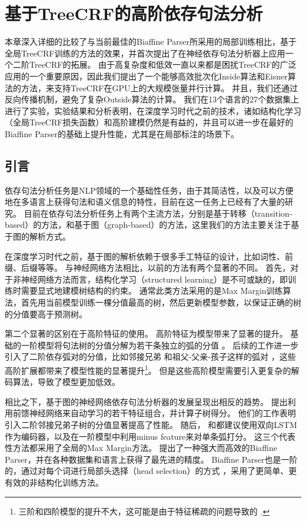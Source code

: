 \chapter{基于TreeCRF的高阶依存句法分析}\label{cha:dep-crf}

本章深入详细的比较了与当前最佳的Biaffine Parser所采用的局部训练相比，基于全局TreeCRF训练的方法的效果，并首次提出了在神经依存句法分析器上应用一个二阶TreeCRF的拓展。
由于高复杂度和低效一直以来都是困扰TreeCRF的广泛应用的一个重要原因，因此我们提出了一个能够高效批次化Inside算法和Eisner算法的方法，来支持TreeCRF在GPU上的大规模张量并行计算。
并且，我们还通过反向传播机制，避免了复杂Outside算法的计算。
我们在13个语言的27个数据集上进行了实验，实验结果和分析表明，在深度学习时代之前的技术，诸如结构化学习（全局TreeCRF损失函数）和高阶建模仍然是有益的，并且可以进一步在最好的Biaffine Parser的基础上提升性能，尤其是在局部标注的场景下。

\section{引言}
依存句法分析任务是NLP领域的一个基础性任务，由于其简洁性，以及可以方便地在多语言上获得句法和语义信息的特性，目前在这一任务上已经有了大量的研究。
目前在依存句法分析任务上有两个主流方法，分别是基于转移（transition-based）的方法，和基于图（graph-based）的方法，这里我们的方法主要关注于基于图的解析方式。

在深度学习时代之前，基于图的解析依赖于很多手工特征的设计，比如词性、前缀、后缀等等。
与神经网络方法相比，以前的方法有两个显著的不同。
首先，对于非神经网络方法而言，结构化学习（structured learning）是不可或缺的，即训练时需要显式地建模树结构的约束。
通常此类方法采用的是Max Margin训练算法，首先用当前模型训练一棵分值最高的树，然后更新模型参数，以保证正确的树的分值要高于预测树。

第二个显著的区别在于高阶特征的使用。
高阶特征为模型带来了显著的提升。
基础的一阶模型将句法树的分值分解为若干条独立的弧的分值 \citep{mcdonald-etal-2005-online}。
后续的工作进一步引入了二阶依存弧对的分值，比如邻接兄弟 \citep{mcdonald-pereira-2006-online}和祖父-父亲-孩子这样的弧对 \citep{carreras-2007-experiments,koo-collins-2010-efficient}，这些高阶扩展都带来了模型性能的显著提升\footnote{三阶和四阶模型的提升不大，这可能是由于特征稀疏的问题导致的 \citep{koo-collins-2010-efficient,ma-zhao-2012-fourth}.}。
但是这些高阶模型需要引入更复杂的解码算法，导致了模型更加低效。

相比之下，基于图的神经网络依存句法分析器的发展呈现出相反的趋势。
\citet{pei-etal-2015-effective}提出利用前馈神经网络来自动学习\citet{chen-manning-2014-fast}的若干特征组合，并计算子树得分。
他们的工作表明引入二阶邻接兄弟子树的分值显著提高了性能。
随后， \citet{wang-chang-2016-graph}和\citet{kiperwasser-goldberg-2016-simple}都建议使用双向LSTM作为编码器，以及在一阶模型中利用minus feature来对单条弧打分。
这三个代表性方法都采用了全局的Max Margin方法。
\citet{dozat-etal-2017-biaffine}提出了一种强大而高效的Biaffine Parser，并在各种数据集和语言上获得了最先进的精度。
Biaffine Parser也是一阶的，通过对每个词进行局部头选择（head selection）的方式 \citep{zhang-etal-2017-head}，采用了更简单、更有效的非结构化训练方法。

